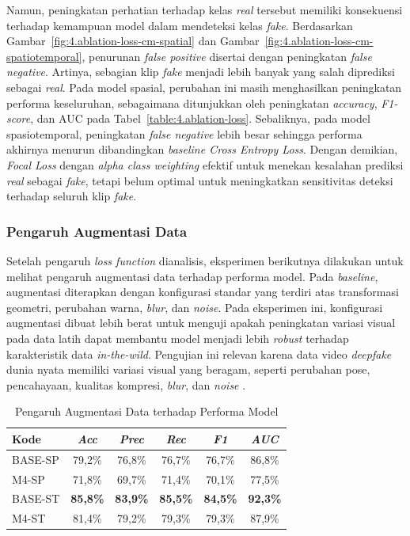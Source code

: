 Namun, peningkatan perhatian terhadap kelas \textit{real} tersebut memiliki konsekuensi terhadap kemampuan model dalam mendeteksi kelas \textit{fake}. Berdasarkan Gambar~\ref{fig:4.ablation-loss-cm-spatial} dan Gambar~\ref{fig:4.ablation-loss-cm-spatiotemporal}, penurunan \textit{false positive} disertai dengan peningkatan \textit{false negative}. Artinya, sebagian klip \textit{fake} menjadi lebih banyak yang salah diprediksi sebagai \textit{real}. Pada model spasial, perubahan ini masih menghasilkan peningkatan performa keseluruhan, sebagaimana ditunjukkan oleh peningkatan \textit{accuracy}, \textit{F1-score}, dan AUC pada Tabel~\ref{table:4.ablation-loss}. Sebaliknya, pada model spasiotemporal, peningkatan \textit{false negative} lebih besar sehingga performa akhirnya menurun dibandingkan \textit{baseline Cross Entropy Loss}. Dengan demikian, \textit{Focal Loss} dengan \textit{alpha class weighting} efektif untuk menekan kesalahan prediksi \textit{real} sebagai \textit{fake}, tetapi belum optimal untuk meningkatkan sensitivitas deteksi terhadap seluruh klip \textit{fake}.

\subsubsection{Pengaruh Augmentasi Data} \label{IV.Eksperimen_Ablation_Augmentasi}
Setelah pengaruh \textit{loss function} dianalisis, eksperimen berikutnya dilakukan untuk melihat pengaruh augmentasi data terhadap performa model. Pada \textit{baseline}, augmentasi diterapkan dengan konfigurasi standar yang terdiri atas transformasi geometri, perubahan warna, \textit{blur}, dan \textit{noise}. Pada eksperimen ini, konfigurasi augmentasi dibuat lebih berat untuk menguji apakah peningkatan variasi visual pada data latih dapat membantu model menjadi lebih \textit{robust} terhadap karakteristik data \textit{in-the-wild}. Pengujian ini relevan karena data video \textit{deepfake} dunia nyata memiliki variasi visual yang beragam, seperti perubahan pose, pencahayaan, kualitas kompresi, \textit{blur}, dan \textit{noise} \cite{MUMUNI2022100258}.

\begin{table}[htbp]
\centering
\caption{Pengaruh Augmentasi Data terhadap Performa Model}
\label{table:4.ablation-augment}
\begin{tabular}{lccccc}
\toprule
\textbf{Kode} &
\textbf{\textit{Acc}} &
\textbf{\textit{Prec}} &
\textbf{\textit{Rec}} &
\textbf{\textit{F1}} &
\textbf{\textit{AUC}} \\
\midrule
BASE-SP & 79,2\% & 76,8\% & 76,7\% & 76,7\% & 86,8\% \\
M4-SP & 71,8\% & 69,7\% & 71,4\% & 70,1\% & 77,5\% \\
\midrule
BASE-ST & \textbf{85,8\%} & \textbf{83,9\%} & \textbf{85,5\%} & \textbf{84,5\%} & \textbf{92,3\%} \\
M4-ST & 81,4\% & 79,2\% & 79,3\% & 79,3\% & 87,9\% \\
\bottomrule
\end{tabular}
\end{table}

